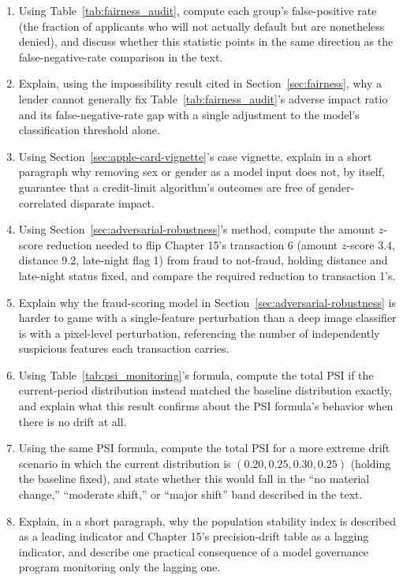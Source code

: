\documentclass[../ai_in_finance]{subfiles}
\begin{document}
\begin{enumerate}
    \item Using Table~\ref{tab:fairness_audit}, compute each group's false-positive rate (the fraction of applicants who will not actually default but are nonetheless denied), and discuss whether this statistic points in the same direction as the false-negative-rate comparison in the text.
    \item Explain, using the impossibility result cited in Section~\ref{sec:fairness}, why a lender cannot generally fix Table~\ref{tab:fairness_audit}'s adverse impact ratio and its false-negative-rate gap with a single adjustment to the model's classification threshold alone.
    \item Using Section~\ref{sec:apple-card-vignette}'s case vignette, explain in a short paragraph why removing sex or gender as a model input does not, by itself, guarantee that a credit-limit algorithm's outcomes are free of gender-correlated disparate impact.
    \item Using Section~\ref{sec:adversarial-robustness}'s method, compute the amount $z$-score reduction needed to flip Chapter 15's transaction 6 (amount $z$-score 3.4, distance 9.2, late-night flag 1) from fraud to not-fraud, holding distance and late-night status fixed, and compare the required reduction to transaction 1's.
    \item Explain why the fraud-scoring model in Section~\ref{sec:adversarial-robustness} is harder to game with a single-feature perturbation than a deep image classifier is with a pixel-level perturbation, referencing the number of independently suspicious features each transaction carries.
    \item Using Table~\ref{tab:psi_monitoring}'s formula, compute the total PSI if the current-period distribution instead matched the baseline distribution exactly, and explain what this result confirms about the PSI formula's behavior when there is no drift at all.
    \item Using the same PSI formula, compute the total PSI for a more extreme drift scenario in which the current distribution is $(0.20, 0.25, 0.30, 0.25)$ (holding the baseline fixed), and state whether this would fall in the ``no material change,'' ``moderate shift,'' or ``major shift'' band described in the text.
    \item Explain, in a short paragraph, why the population stability index is described as a leading indicator and Chapter 15's precision-drift table as a lagging indicator, and describe one practical consequence of a model governance program monitoring only the lagging one.

\end{enumerate}
\end{document}
